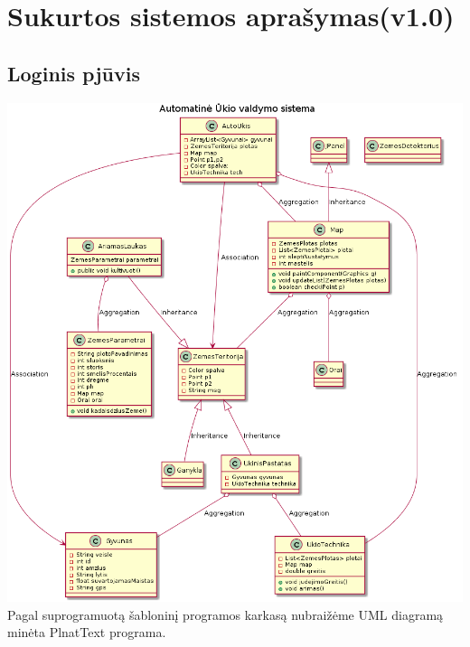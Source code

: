 ﻿\documentclass[oneside]{VUMIFPSkursinis}
\begin{document}
\section{Sukurtos sistemos aprašymas(v1.0)}

\subsection{Loginis pjūvis}
	\includegraphics[width=\textwidth,height=\textheight,keepaspectratio]{uml.png}	
	Pagal suprogramuotą šabloninį programos karkasą nubraižėme UML diagramą minėta PlnatText programa.
\end{document}
